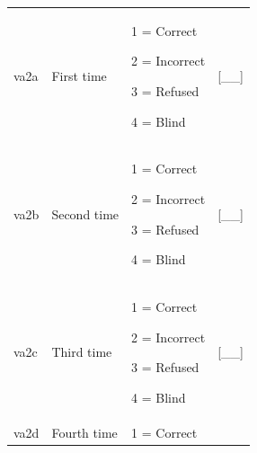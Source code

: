\documentclass[12pt,a4paper]{book}
\theoremstyle{definition}
\theoremstyle{definition}
\theoremstyle{definition}
\theoremstyle{remark}
\begin{document}
\begin{longtable}[]{@{}llll@{}}
\toprule
\begin{minipage}[t]{0.24\columnwidth}\raggedright
va2a\strut
\end{minipage} & \begin{minipage}[t]{0.24\columnwidth}\raggedright
First time\strut
\end{minipage} & \begin{minipage}[t]{0.24\columnwidth}\raggedright
1 = Correct

2 = Incorrect

3 = Refused

4 = Blind\strut
\end{minipage} & \begin{minipage}[t]{0.24\columnwidth}\raggedright
{[}\_\_{]}\strut
\end{minipage}\tabularnewline
\begin{minipage}[t]{0.24\columnwidth}\raggedright
va2b\strut
\end{minipage} & \begin{minipage}[t]{0.24\columnwidth}\raggedright
Second time\strut
\end{minipage} & \begin{minipage}[t]{0.24\columnwidth}\raggedright
1 = Correct

2 = Incorrect

3 = Refused

4 = Blind\strut
\end{minipage} & \begin{minipage}[t]{0.24\columnwidth}\raggedright
{[}\_\_{]}\strut
\end{minipage}\tabularnewline
\begin{minipage}[t]{0.24\columnwidth}\raggedright
va2c\strut
\end{minipage} & \begin{minipage}[t]{0.24\columnwidth}\raggedright
Third time\strut
\end{minipage} & \begin{minipage}[t]{0.24\columnwidth}\raggedright
1 = Correct

2 = Incorrect

3 = Refused

4 = Blind\strut
\end{minipage} & \begin{minipage}[t]{0.24\columnwidth}\raggedright
{[}\_\_{]}\strut
\end{minipage}\tabularnewline
\begin{minipage}[t]{0.24\columnwidth}\raggedright
va2d\strut
\end{minipage} & \begin{minipage}[t]{0.24\columnwidth}\raggedright
Fourth time\strut
\end{minipage} & \begin{minipage}[t]{0.24\columnwidth}\raggedright
1 = Correct


\end{minipage}
\end{longtable}
\end{document}
